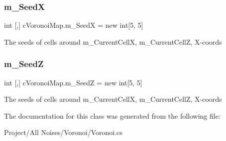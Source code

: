 \subsubsection{\texorpdfstring{m\+\_\+\+SeedX}{m\_SeedX}}
{\footnotesize\ttfamily int \mbox{[},\mbox{]} c\+Voronoi\+Map.\+m\+\_\+\+SeedX = new int\mbox{[}5, 5\mbox{]}\hspace{0.3cm}{\ttfamily [protected]}}

The seeds of cells around m\+\_\+\+Current\+CellX, m\+\_\+\+Current\+CellZ, X-\/coords \mbox{\label{classc_voronoi_map_afbaf9b18957ec7e155dae273f9178cf9}} 
\subsubsection{\texorpdfstring{m\+\_\+\+SeedZ}{m\_SeedZ}}
{\footnotesize\ttfamily int \mbox{[},\mbox{]} c\+Voronoi\+Map.\+m\+\_\+\+SeedZ = new int\mbox{[}5, 5\mbox{]}\hspace{0.3cm}{\ttfamily [protected]}}

The seeds of cells around m\+\_\+\+Current\+CellX, m\+\_\+\+Current\+CellZ, X-\/coords 

The documentation for this class was generated from the following file\+:\begin{DoxyCompactItemize}
\item 
Project/\+All Noises/\+Voronoi/Voronoi.\+cs\end{DoxyCompactItemize}
